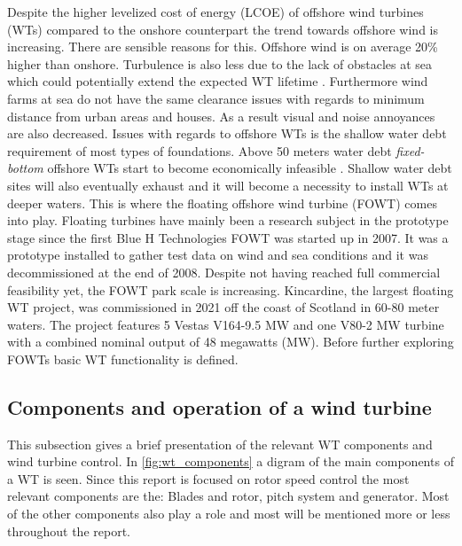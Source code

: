 \smallskip
Despite the higher levelized cost of energy (LCOE) of offshore wind turbines (WTs) compared to the onshore counterpart the trend towards offshore wind is increasing. There are sensible reasons for this. Offshore wind is on average 20\% higher than onshore. Turbulence is also less due to the lack of obstacles at sea which could potentially extend the expected WT lifetime \cite{Christiansen2013}. Furthermore wind farms at sea do not have the same clearance issues with regards to minimum distance from urban areas and houses. As a result visual and noise annoyances are also decreased. Issues with regards to offshore WTs is the shallow water debt requirement of most types of foundations. Above 50 meters water debt \textit{fixed-bottom} offshore WTs start to become economically infeasible \cite{Lefebvre2012}. Shallow water debt sites will also eventually exhaust and it will become a necessity to install WTs at deeper waters. This is where the floating offshore wind turbine (FOWT) comes into play. Floating turbines have mainly been a research subject in the prototype stage since the first Blue H Technologies FOWT was started up in 2007. It was a prototype installed to gather test data on wind and sea conditions and it was decommissioned at the end of 2008. Despite not having reached full commercial feasibility yet, the FOWT park scale is increasing. Kincardine, the largest floating WT project, was commissioned in 2021 off the coast of Scotland in 60-80 meter waters. The project features 5 Vestas V164-9.5 MW and one V80-2 MW turbine with a combined nominal output of 48 megawatts (MW). Before further exploring FOWTs basic WT functionality is defined.


\subsection{Components and operation of a wind turbine} \label{sec:intro_wtcomponents}
This subsection gives a brief presentation of the relevant WT components and wind turbine control. In \cref{fig:wt_components} a digram of the main components of a WT is seen. Since this report is focused on rotor speed control the most relevant components are the: Blades and rotor, pitch system and generator. Most of the other components also play a role and most will be mentioned more or less throughout the report. 

